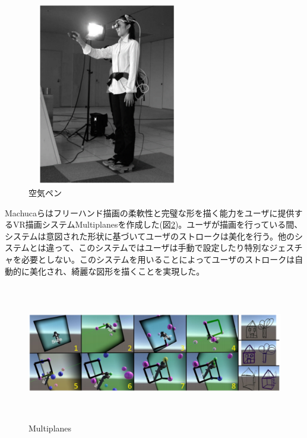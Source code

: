 \documentclass[11pt,a4j, titlepage]{jarticle} %
\begin{document}
\begin{figure}[H]
  \begin{center}
    \includegraphics[clip,height=8.0cm,width=7.0cm]{./kuukipen.eps}
    \caption{空気ペン}
    \label{fig:kuukipen}
  \end{center}
\end{figure}

Machucaら\cite{machuca}はフリーハンド描画の柔軟性と完璧な形を描く能力をユーザに提供するVR描画システムMultiplanesを作成した(図\ref{fig:multiplanes})。ユーザが描画を行っている間、システムは意図された形状に基づいてユーザのストロークは美化を行う。他のシステムとは違って、このシステムではユーザは手動で設定したり特別なジェスチャを必要としない。このシステムを用いることによってユーザのストロークは自動的に美化され、綺麗な図形を描くことを実現した。

\begin{figure}[H]
  \begin{center}
    \includegraphics[clip,height=6.0cm,width=15.0cm]{./multiplanes.eps}
    \caption{Multiplanes}
    \label{fig:multiplanes}
  \end{center}
\end{figure}
\end{document}
